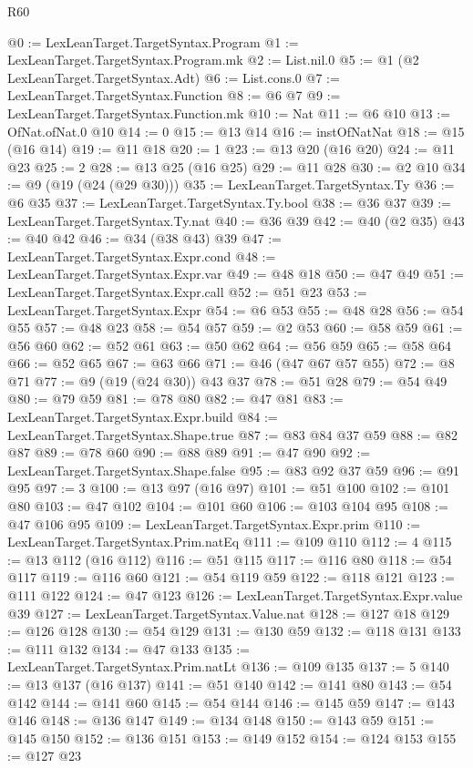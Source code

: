 \begin{lexlean}{R60}
\begin{coremodule}
@0 := LexLeanTarget.TargetSyntax.Program
@1 := LexLeanTarget.TargetSyntax.Program.mk
@2 := List.nil.{0}
@5 := @1 (@2 LexLeanTarget.TargetSyntax.Adt)
@6 := List.cons.{0}
@7 := LexLeanTarget.TargetSyntax.Function
@8 := @6 @7
@9 := LexLeanTarget.TargetSyntax.Function.mk
@10 := Nat
@11 := @6 @10
@13 := OfNat.ofNat.{0} @10
@14 := 0
@15 := @13 @14
@16 := instOfNatNat
@18 := @15 (@16 @14)
@19 := @11 @18
@20 := 1
@23 := @13 @20 (@16 @20)
@24 := @11 @23
@25 := 2
@28 := @13 @25 (@16 @25)
@29 := @11 @28
@30 := @2 @10
@34 := @9 (@19 (@24 (@29 @30)))
@35 := LexLeanTarget.TargetSyntax.Ty
@36 := @6 @35
@37 := LexLeanTarget.TargetSyntax.Ty.bool
@38 := @36 @37
@39 := LexLeanTarget.TargetSyntax.Ty.nat
@40 := @36 @39
@42 := @40 (@2 @35)
@43 := @40 @42
@46 := @34 (@38 @43) @39
@47 := LexLeanTarget.TargetSyntax.Expr.cond
@48 := LexLeanTarget.TargetSyntax.Expr.var
@49 := @48 @18
@50 := @47 @49
@51 := LexLeanTarget.TargetSyntax.Expr.call
@52 := @51 @23
@53 := LexLeanTarget.TargetSyntax.Expr
@54 := @6 @53
@55 := @48 @28
@56 := @54 @55
@57 := @48 @23
@58 := @54 @57
@59 := @2 @53
@60 := @58 @59
@61 := @56 @60
@62 := @52 @61
@63 := @50 @62
@64 := @56 @59
@65 := @58 @64
@66 := @52 @65
@67 := @63 @66
@71 := @46 (@47 @67 @57 @55)
@72 := @8 @71
@77 := @9 (@19 (@24 @30)) @43 @37
@78 := @51 @28
@79 := @54 @49
@80 := @79 @59
@81 := @78 @80
@82 := @47 @81
@83 := LexLeanTarget.TargetSyntax.Expr.build
@84 := LexLeanTarget.TargetSyntax.Shape.true
@87 := @83 @84 @37 @59
@88 := @82 @87
@89 := @78 @60
@90 := @88 @89
@91 := @47 @90
@92 := LexLeanTarget.TargetSyntax.Shape.false
@95 := @83 @92 @37 @59
@96 := @91 @95
@97 := 3
@100 := @13 @97 (@16 @97)
@101 := @51 @100
@102 := @101 @80
@103 := @47 @102
@104 := @101 @60
@106 := @103 @104 @95
@108 := @47 @106 @95
@109 := LexLeanTarget.TargetSyntax.Expr.prim
@110 := LexLeanTarget.TargetSyntax.Prim.natEq
@111 := @109 @110
@112 := 4
@115 := @13 @112 (@16 @112)
@116 := @51 @115
@117 := @116 @80
@118 := @54 @117
@119 := @116 @60
@121 := @54 @119 @59
@122 := @118 @121
@123 := @111 @122
@124 := @47 @123
@126 := LexLeanTarget.TargetSyntax.Expr.value @39
@127 := LexLeanTarget.TargetSyntax.Value.nat
@128 := @127 @18
@129 := @126 @128
@130 := @54 @129
@131 := @130 @59
@132 := @118 @131
@133 := @111 @132
@134 := @47 @133
@135 := LexLeanTarget.TargetSyntax.Prim.natLt
@136 := @109 @135
@137 := 5
@140 := @13 @137 (@16 @137)
@141 := @51 @140
@142 := @141 @80
@143 := @54 @142
@144 := @141 @60
@145 := @54 @144
@146 := @145 @59
@147 := @143 @146
@148 := @136 @147
@149 := @134 @148
@150 := @143 @59
@151 := @145 @150
@152 := @136 @151
@153 := @149 @152
@154 := @124 @153
@155 := @127 @23

\end{coremodule}
\end{lexlean}
